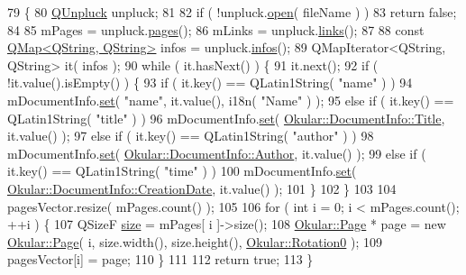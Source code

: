 \begin{DoxyCode}
79 \{
80     \hyperlink{classQUnpluck}{QUnpluck} unpluck;
81 
82     \textcolor{keywordflow}{if} ( !unpluck.\hyperlink{classQUnpluck_a0b5ec934d6ce0c877654875fe8a2e72f}{open}( fileName ) )
83         \textcolor{keywordflow}{return} \textcolor{keyword}{false};
84 
85     mPages = unpluck.\hyperlink{classQUnpluck_a41b9cc2f7be551f5f077531259780a0e}{pages}();
86     mLinks = unpluck.\hyperlink{classQUnpluck_acc1af02ba43c3d84cd85517b4085ac7d}{links}();
87 
88     \textcolor{keyword}{const} \hyperlink{classQMap}{QMap<QString, QString>} infos = unpluck.\hyperlink{classQUnpluck_a7693166ed831bb1d492395038f3d0186}{infos}();
89     QMapIterator<QString, QString> it( infos );
90     \textcolor{keywordflow}{while} ( it.hasNext() ) \{
91         it.next();
92         \textcolor{keywordflow}{if} ( !it.value().isEmpty() ) \{
93             \textcolor{keywordflow}{if} ( it.key() == QLatin1String( \textcolor{stringliteral}{"name"} ) )
94                 mDocumentInfo.\hyperlink{classOkular_1_1DocumentInfo_a8bd5403394ab192f1103cbf2a8e48d9b}{set}( \textcolor{stringliteral}{"name"}, it.value(), i18n( \textcolor{stringliteral}{"Name"} ) );
95             \textcolor{keywordflow}{else} \textcolor{keywordflow}{if} ( it.key() == QLatin1String( \textcolor{stringliteral}{"title"} ) )
96                 mDocumentInfo.\hyperlink{classOkular_1_1DocumentInfo_a8bd5403394ab192f1103cbf2a8e48d9b}{set}( \hyperlink{classOkular_1_1DocumentInfo_a3a6e5f7fb246e29bcb2e830b6f770791ae400626d63f14b61c55bd22aca9481e0}{Okular::DocumentInfo::Title}, it.value() );
97             \textcolor{keywordflow}{else} \textcolor{keywordflow}{if} ( it.key() == QLatin1String( \textcolor{stringliteral}{"author"} ) )
98                 mDocumentInfo.\hyperlink{classOkular_1_1DocumentInfo_a8bd5403394ab192f1103cbf2a8e48d9b}{set}( \hyperlink{classOkular_1_1DocumentInfo_a3a6e5f7fb246e29bcb2e830b6f770791a1010574d070b1925e030c20fef3e7a35}{Okular::DocumentInfo::Author}, it.value() 
      );
99             \textcolor{keywordflow}{else} \textcolor{keywordflow}{if} ( it.key() == QLatin1String( \textcolor{stringliteral}{"time"} ) )
100                 mDocumentInfo.\hyperlink{classOkular_1_1DocumentInfo_a8bd5403394ab192f1103cbf2a8e48d9b}{set}( \hyperlink{classOkular_1_1DocumentInfo_a3a6e5f7fb246e29bcb2e830b6f770791a58a72aeacd3cb08e85d0f9f19b2fe83a}{Okular::DocumentInfo::CreationDate},
       it.value() );
101         \}
102     \}
103 
104     pagesVector.resize( mPages.count() );
105 
106     \textcolor{keywordflow}{for} ( \textcolor{keywordtype}{int} i = 0; i < mPages.count(); ++i ) \{
107         QSizeF \hyperlink{synctex__parser_8c_aa23c661441688350614bd6a350d2b6ff}{size} = mPages[ i ]->size();
108         \hyperlink{classOkular_1_1Page}{Okular::Page} * page = \textcolor{keyword}{new} \hyperlink{classOkular_1_1Page}{Okular::Page}( i, size.width(), size.height(), 
      \hyperlink{namespaceOkular_a8556d00465f61ef533c6b027669e7da6aa4df8fc3dd09e30520c264c8d23d89c2}{Okular::Rotation0} );
109         pagesVector[i] = page;
110     \}
111 
112     \textcolor{keywordflow}{return} \textcolor{keyword}{true};
113 \}
\end{DoxyCode}
